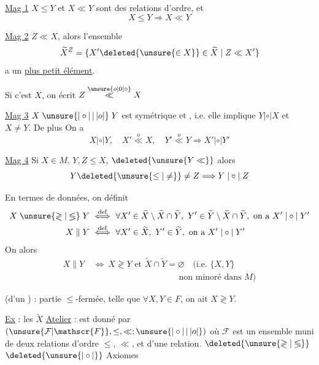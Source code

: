 
\uline{Mag 1} $X\leq Y$ et $X\ll Y$ sont des relations d'ordre, et
\[
X\leq Y\Longrightarrow X\ll Y
\]

\uline{Mag 2}  $Z\ll X$, alors l'ensemble
\[
\widetilde{X}^{Z}=\{X'\deleted{\unsure{\in X}}\in\widetilde{X}\mid Z\ll X'\}
\]
a un \uline{plus petit élément}.

Si c'est $X$, on écrit $Z\mathrel{\overset{\unsure{o|0|\circ}}{\ll}}X$

\uline{Mag 3} $X\mathrel{\unsure{|\circ|\,|\,|o|}}Y$ est symétrique et , i.e. elle implique $Y\mathrel{|\circ|}X$ et $X\ne Y$. De plus On a
\[
X\mathrel{|\circ|}Y,\quad X'\mathrel{\overset{o}{\ll}}X,\quad Y'\mathrel{\overset{o}{\ll}}Y\Longrightarrow X'\mathrel{|\circ|}Y'
\]

\uline{Mag 4} Si $X\in M$, $Y,Z\leq X$, $\deleted{\unsure{Y\ll}}$ alors
\[
Y\deleted{\unsure{\leq|\ne}}\ne Z\Longrightarrow Y\mathrel{|\circ|}Z
\]

En termes de  données, on définit
\[
\begin{aligned}
X\mathrel{\unsure{\gtrless|\lessgtr}}Y\ &\overset{\mathrm{def}}{\Longleftrightarrow}\ \forall X'\in\widetilde{X}\setminus\widetilde{X}\cap\widetilde{Y},\ Y'\in\widetilde{Y}\setminus\widetilde{X}\cap\widetilde{Y},\ \text{on a }X'\mathrel{|\circ|}Y'\\
X\mathrel{\|}Y\ &\overset{\mathrm{def}}{\Longleftrightarrow}\ \forall X'\in\widetilde{X},\ Y'\in\widetilde{Y},\ \text{on a }X'\mathrel{|\circ|}Y'
\end{aligned}
\]
On  alors
\[
\begin{aligned}
X\mathrel{\|}Y\ &\Longleftrightarrow\ X\mathrel{\gtrless}Y\text{ et }\widetilde{X}\cap\widetilde{Y}=\varnothing\quad\text{(i.e. }\{X,Y\}\\
&\hspace{10em}\text{non minoré dans }M\text{)}
\end{aligned}
\]

  (d'un ) : partie $\leq$-fermée, telle que $\forall X,Y\in F$, on ait $X\mathrel{\gtrless}Y$.

 \uline{Ex} : les $\widetilde{X}$
\uline{Atelier} : est donné par $(\unsure{\mathcal{F}|\mathscr{F}},\leq,\ll;\unsure{|\circ|\,|\,|o|})$ où $\mathcal{F}$ est un ensemble muni de deux relations d'ordre $\leq$, $\ll$, et d'une  relation. $\deleted{\unsure{\gtrless|\lessgtr}}$ $\deleted{\unsure{|\circ|}}$ Axiomes

